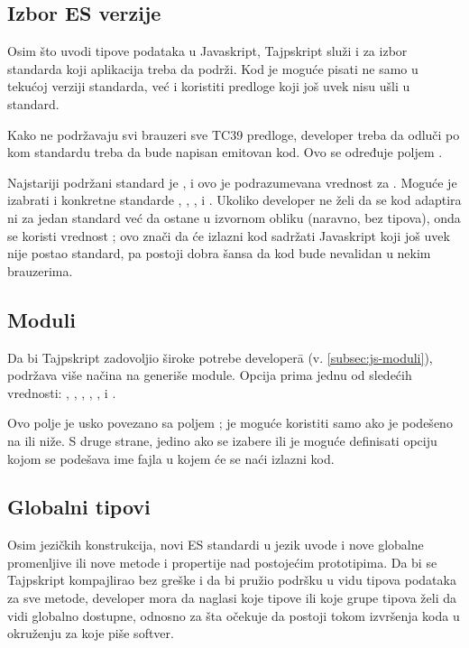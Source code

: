 \subsection{Izbor ES verzije}

Osim što uvodi tipove podataka u Javaskript, Tajpskript služi i za izbor standarda koji aplikacija treba da podrži.
Kod je moguće pisati ne samo u tekućoj verziji standarda, već i koristiti predloge koji još uvek nisu ušli u standard.

Kako ne podržavaju svi brauzeri sve TC39 predloge, developer treba da odluči po kom standardu treba da bude napisan emitovan kod.
Ovo se određuje poljem .

Najstariji podržani standard je , i ovo je podrazumevana vrednost za .
Moguće je izabrati i konkretne standarde , , ,  i .
Ukoliko developer ne želi da se kod adaptira ni za jedan standard već da ostane u izvornom obliku (naravno, bez tipova), onda se koristi vrednost ; ovo znači da će izlazni kod sadržati Javaskript koji još uvek nije postao standard, pa postoji dobra šansa da kod bude nevalidan u nekim brauzerima.

\subsection{Moduli}

Da bi Tajpskript zadovoljio široke potrebe developer\=a (v. \cref{subsec:js-moduli}), podržava više načina na generiše module.
Opcija  prima jednu od sledećih vrednosti: , , , , , i .

Ovo polje je usko povezano sa poljem ;  je moguće koristiti samo ako je  podešeno na  ili niže.
S druge strane, jedino ako se izabere  ili  je moguće definisati opciju  kojom se podešava ime fajla u kojem će se naći izlazni kod.

\subsection{Globalni tipovi}

Osim jezičkih konstrukcija, novi ES standardi u jezik uvode i nove globalne promenljive ili nove metode i propertije nad postojećim prototipima.
Da bi se Tajpskript kompajlirao bez greške i da bi pružio podršku u vidu tipova podataka za sve metode, developer mora da naglasi koje tipove ili koje grupe tipova želi da vidi globalno dostupne, odnosno za šta očekuje da postoji tokom izvršenja koda u okruženju za koje piše softver.

